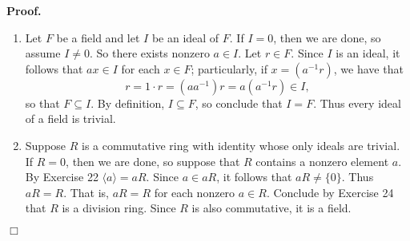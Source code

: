 \documentclass[9pt]{article}
\newcommand{\qed}{\hfill \ensuremath{\Box}}
\newcommand{\cyc}[1]{\langle #1 \rangle}
\begin{document}
\begin{enumerate}
      \textbf{Proof.}
      
      \begin{enumerate}
         \item Let $F$ be a field and let $I$ be an ideal of $F$. If $I = 0$,
               then we are done, so assume $I \neq 0$. So there exists nonzero
               $a \in I$. Let $r \in F$. Since $I$ is an ideal, it follows that
               $ax \in I$ for each $x \in F$; particularly, if $x = (a^{-1}r)$,
               we have that
               $$r = 1 \cdot r = (aa^{-1})r = a(a^{-1}r) \in I,$$
               so that $F \subseteq I$. By definition, $I \subseteq F$, so
               conclude that $I = F$. Thus every ideal of a field is trivial.
         \item Suppose $R$ is a commutative ring with identity whose only ideals
               are trivial. If $R = 0$, then we are done, so suppose that $R$
               contains a nonzero element $a$. By Exercise 22 $\cyc{a} = aR$.
               Since $a \in aR$, it follows that $aR \neq \{0\}$. Thus $aR = R$.
               That is, $aR = R$ for each nonzero $a \in R$. Conclude by
               Exercise 24 that $R$ is a division ring. Since $R$ is also
               commutative, it is a field.
      \end{enumerate} \qed
\end{enumerate}
\end{document}
